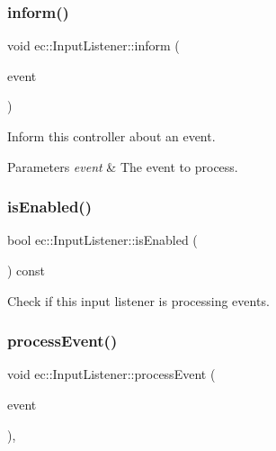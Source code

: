 \subsubsection{\texorpdfstring{inform()}{inform()}}
{\footnotesize\ttfamily void ec\+::\+Input\+Listener\+::inform (\begin{DoxyParamCaption}\item[{const \mbox{\hyperlink{structec_1_1_input_event}{Input\+Event}} \&}]{event }\end{DoxyParamCaption})}



Inform this controller about an event. 


\begin{DoxyParams}{Parameters}
{\em event} & The event to process. \\
\hline
\end{DoxyParams}
\mbox{\label{classec_1_1_input_listener_a6d7a4e04543e3a86745261d9fefcbfc1}} 
\subsubsection{\texorpdfstring{is\+Enabled()}{isEnabled()}}
{\footnotesize\ttfamily bool ec\+::\+Input\+Listener\+::is\+Enabled (\begin{DoxyParamCaption}{ }\end{DoxyParamCaption}) const\hspace{0.3cm}{\ttfamily [virtual]}}



Check if this input listener is processing events. 

\mbox{\label{classec_1_1_input_listener_a9ceaefc79c6b0b260e88454616137840}} 
\subsubsection{\texorpdfstring{process\+Event()}{processEvent()}}
{\footnotesize\ttfamily void ec\+::\+Input\+Listener\+::process\+Event (\begin{DoxyParamCaption}\item[{const \mbox{\hyperlink{structec_1_1_input_event}{Input\+Event}} \&}]{event }\end{DoxyParamCaption})\hspace{0.3cm}{\ttfamily [protected]}, {\ttfamily [virtual]}}



